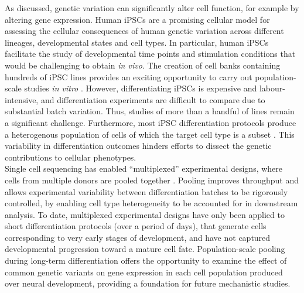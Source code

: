 As discussed, genetic variation can significantly alter cell function, for example by altering gene expression. 
Human iPSCs are a promising cellular model for assessing the cellular consequences of human genetic variation across different lineages, developmental states and cell types. 
In particular, human iPSCs facilitate the study of developmental time points and stimulation conditions that would be challenging to obtain \textit{in vivo}. 
The creation of cell banks containing hundreds of iPSC lines \cite{kilpinen2017common} provides an exciting opportunity to carry out population-scale studies \textit{in vitro} \cite{cuomo2020single, strober2019dynamic, schwartzentruber2018molecular, alasoo2018shared}.
However, differentiating iPSCs is expensive and labour-intensive, and differentiation experiments are difficult to compare due to substantial batch variation. 
Thus, studies of more than a handful of lines remain a significant challenge.
Furthermore, most iPSC differentiation protocols produce a heterogenous population of cells of which the target cell type is a subset \cite{d2019vitro, banovich2018impact, volpato2018reproducibility, nguyen2018single}. 
This variability in differentiation outcomes hinders efforts to dissect the genetic contributions to cellular phenotypes.\\

Single cell sequencing has enabled “multiplexed” experimental designs, where cells from multiple donors are pooled together \cite{cuomo2020single, nguyen2018single}. 
Pooling improves throughput and allows experimental variability between differentiation batches to be rigorously controlled, by enabling cell type heterogeneity to be accounted for in downstream analysis. 
To date, multiplexed experimental designs have only been applied to short differentiation protocols (over a period of days), that generate cells corresponding to very early stages of development, and have not captured developmental progression toward a mature cell fate. 
Population-scale pooling during long-term differentiation offers the opportunity to examine the effect of common genetic variants on gene expression in each cell population produced over neural development, providing a foundation for future mechanistic studies.

